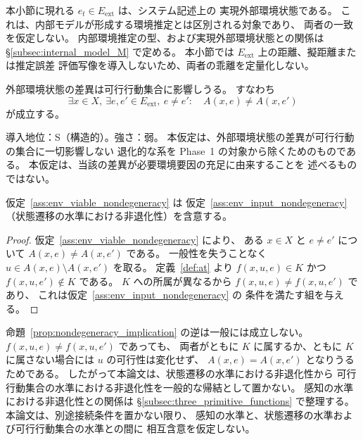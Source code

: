 \begin{remark}[実現外部環境状態と内部推定の区別についての予告]
\label{rem:actual_environment_and_internal_estimate}
本小節に現れる $e_t\in E_{\mathrm{ext}}$ は、システム記述上の
実現外部環境状態である。
これは、内部モデルが形成する環境推定とは区別される対象であり、
両者の一致を仮定しない。
内部環境推定の型、および実現外部環境状態との関係は
\S\ref{subsec:internal_model_M} で定める。
本小節では $E_{\mathrm{ext}}$ 上の距離、擬距離または推定誤差
評価写像を導入しないため、両者の乖離を定量化しない。
\end{remark}

\begin{assumption}[可行行動集合に対する環境入力の非退化性]
\label{ass:env_viable_nondegeneracy}
外部環境状態の差異は可行行動集合に影響しうる。
すなわち
\[
  \exists x\in X,\
  \exists e,e'\in E_{\mathrm{ext}},\
  e\neq e':
  \quad
  A(x,e)\neq A(x,e')
\]
が成立する。

\medskip
\noindent
導入地位：S（構造的）。強さ：弱。
本仮定は、外部環境状態の差異が可行行動の集合に一切影響しない
退化的な系を Phase~1 の対象から除くためのものである。
本仮定は、当該の差異が必要環境要因の充足に由来することを
述べるものではない。
\end{assumption}

\begin{proposition}[非退化性の水準間の含意]
\label{prop:nondegeneracy_implication}
仮定~\ref{ass:env_viable_nondegeneracy} は
仮定~\ref{ass:env_input_nondegeneracy}
（状態遷移の水準における非退化性）を含意する。
\end{proposition}

\begin{proof}
仮定~\ref{ass:env_viable_nondegeneracy} により、
ある $x\in X$ と $e\neq e'$ について
$A(x,e)\neq A(x,e')$ である。
一般性を失うことなく
$u\in A(x,e)\setminus A(x,e')$ を取る。
定義~\ref{def:at} より $f(x,u,e)\in K$ かつ
$f(x,u,e')\notin K$ である。
$K$ への所属が異なるから
$f(x,u,e)\neq f(x,u,e')$ であり、
これは仮定~\ref{ass:env_input_nondegeneracy} の
条件を満たす組を与える。
\end{proof}

\begin{remark}[逆向きの含意について]
\label{rem:nondegeneracy_converse}
命題~\ref{prop:nondegeneracy_implication} の逆は一般には成立しない。
$f(x,u,e)\neq f(x,u,e')$ であっても、
両者がともに $K$ に属するか、ともに $K$ に属さない場合には
$u$ の可行性は変化せず、
$A(x,e)=A(x,e')$ となりうるためである。
したがって本論文は、状態遷移の水準における非退化性から
可行行動集合の水準における非退化性を一般的な帰結として置かない。
感知の水準における非退化性との関係は
\S\ref{subsec:three_primitive_functions} で整理する。
本論文は、別途接続条件を置かない限り、
感知の水準と、状態遷移の水準および可行行動集合の水準との間に
相互含意を仮定しない。
\end{remark}

